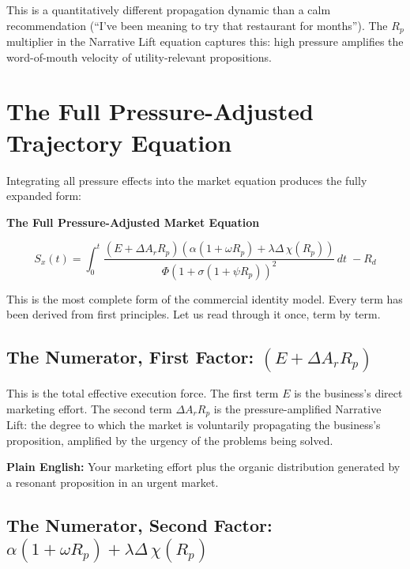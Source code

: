 \documentclass[12pt, openany]{book}
\theoremstyle{thmstyle}
\theoremstyle{defstyle}
\begin{document}
This is a quantitatively different propagation dynamic than a calm recommendation (``I've been meaning to try that restaurant for months''). The $R_p$ multiplier in the Narrative Lift equation captures this: high pressure amplifies the word-of-mouth velocity of utility-relevant propositions.

\section{The Full Pressure-Adjusted Trajectory Equation}

Integrating all pressure effects into the market equation produces the fully expanded form:

\begin{masterbox}
\begin{center}
\textbf{The Full Pressure-Adjusted Market Equation}
\end{center}
\begin{equation}
S_x(t) = \int_0^t
\frac{
\left(E + \Delta A_r R_p\right)
\left(\alpha(1 + \omega R_p) + \lambda\Delta\,\chi(R_p)\right)
}{
\Phi\left(1 + \sigma(1 + \psi R_p)\right)^2
}
\, dt \; - R_d
\label{eq:master}
\end{equation}
\end{masterbox}

This is the most complete form of the commercial identity model. Every term has been derived from first principles. Let us read through it once, term by term.

\subsection{The Numerator, First Factor: $(E + \Delta A_r R_p)$}

This is the total effective execution force. The first term $E$ is the business's direct marketing effort. The second term $\Delta A_r R_p$ is the pressure-amplified Narrative Lift: the degree to which the market is voluntarily propagating the business's proposition, amplified by the urgency of the problems being solved.

\textbf{Plain English:} Your marketing effort plus the organic distribution generated by a resonant proposition in an urgent market.

\subsection{The Numerator, Second Factor: $\alpha(1 + \omega R_p) + \lambda\Delta\,\chi(R_p)$}
\end{document}
